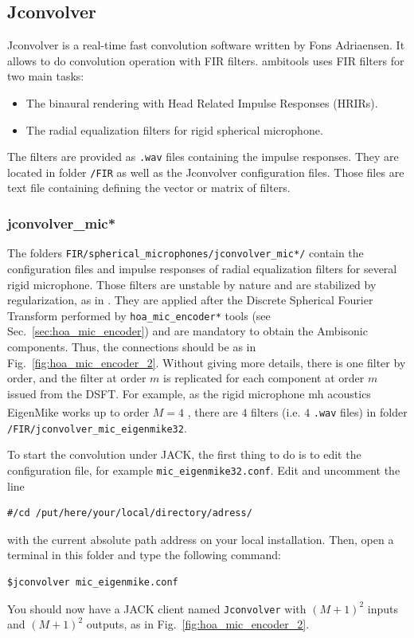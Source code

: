 \documentclass[10pt,a4paper]{article}
\begin{document}
\pagebreak
\subsection{Jconvolver}
Jconvolver is a real-time fast convolution software written by Fons Adriaensen. It allows to do convolution operation with FIR filters. ambitools uses FIR filters for two main tasks:
\begin{itemize}
\item The binaural rendering with Head Related Impulse Responses (HRIRs).
\item The radial equalization filters for rigid spherical microphone.
\end{itemize}
The filters are provided as \lstinline'.wav' files containing the impulse responses. They are located in folder \lstinline'/FIR' as well as the Jconvolver configuration files. Those files are text file containing defining the vector or matrix of filters.

\label{sec:jconvolver}
\subsubsection{jconvolver\_mic*}
The folders \lstinline'FIR/spherical_microphones/jconvolver_mic*/' contain the configuration files and impulse responses of radial equalization filters for several rigid microphone. Those filters are unstable by nature and are stabilized by regularization, as in \cite{moreau20063d}. They are applied after the Discrete Spherical Fourier Transform performed by \lstinline'hoa_mic_encoder*' tools (see Sec.~\ref{sec:hoa_mic_encoder}) and are mandatory to obtain the Ambisonic components. Thus, the connections should be as in Fig.~\ref{fig:hoa_mic_encoder_2}. Without giving more details, there is one filter by order, and the filter at order $m$ is replicated for each component at order $m$ issued from the DSFT. For example, as the rigid microphone mh acoustics EigenMike\textsuperscript{\textregistered} works up to order $M=4$ \cite{elko2009audio}, there are $4$ filters (i.e. $4$ \lstinline'.wav' files) in folder \lstinline'/FIR/jconvolver_mic_eigenmike32'.

To start the convolution under JACK, the first thing to do is to edit the configuration file, for example \lstinline'mic_eigenmike32.conf'. Edit and uncomment the line 
\begin{lstlisting}
#/cd /put/here/your/local/directory/adress/
\end{lstlisting}
with the current absolute path address on your local installation.
Then, open a terminal in this folder and type the following command:
\begin{lstlisting}
$jconvolver mic_eigenmike.conf
\end{lstlisting}
You should now have a JACK client named \lstinline'Jconvolver' with $(M+1)^2$ inputs and $(M+1)^2$ outputs, as in Fig.~\ref{fig:hoa_mic_encoder_2}.
\end{document}
